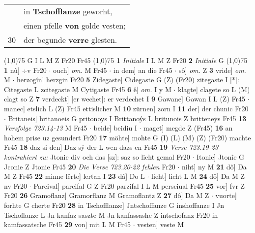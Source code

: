 \documentclass[8pt,a4paper,notitlepage]{article}
\begin{document}
\begin{table}[ht]
\begin{minipage}[t]{0.5\linewidth}
\begin{tabular}{rl}
 & in \textbf{Tschofflanze} geworht,\\ 
 & einen pfelle \textbf{von} golde vesten;\\ 
30 & der begunde \textbf{verre} glesten.\\ 
\end{tabular}
\scriptsize
\line(1,0){75} \newline
G I L M Z Fr20 Fr45 \newline
\line(1,0){75} \newline
\textbf{1} \textit{Initiale} I L M Z Fr20  \textbf{2} \textit{Initiale} G  \newline
\line(1,0){75} \newline
\textbf{1} nû] ÷v Fr20  $\cdot$ ouch] \textit{om.} M Fr45  $\cdot$ in dem] an die Fr45  $\cdot$ sô] \textit{om.} Z \textbf{3} vride] \textit{om.} M  $\cdot$ herzogîn] herzgin Fr20 \textbf{5} Zidegaste] Cidegaste G (Z) (Fr20) zitegaste I [*]: Citegaste L zcitegaste M Cytigaste Fr45 \textbf{6} ê] \textit{om.} I y M  $\cdot$ klagte] clagete so L (M) clagt so Z \textbf{7} verdeckt] [er wechet]: er verdechet I \textbf{9} Gawane] Gawan I L (Z) Fr45  $\cdot$ manec] etslich L (Z) Fr45 ettislicher M \textbf{10} zürnen] zorn I \textbf{11} der] der chunic Fr20  $\cdot$ Britaneis] britanoeis G pritonoys I Brittanoýs L britunois Z britteneẏs Fr45 \textbf{13} \textit{Versfolge 723.14-13} M Fr45   $\cdot$ beide] beidiu I  $\cdot$ maget] megde Z (Fr45) \textbf{16} an hohem prise uz gesundert Fr20 \textbf{17} möhte] mohte G (I) (L) (M) (Z) (Fr20) machte Fr45 \textbf{18} daz si den] Daz sẏ der L wen dazs en Fr45 \textbf{19} \textit{Verse 723.19-23 kontrahiert zu:} Jtonie div och das [sz]: saz so lieht gemal Fr20   $\cdot$ Itonie] Jtonîe G Jconie Z Jtonie Fr45 \textbf{20} \textit{Die Verse 723.20-22 fehlen} Fr20   $\cdot$ niht] ny M \textbf{21} dô] Da M Z Fr45 \textbf{22} minne lêrte] lertan I \textbf{23} dâ] Do L  $\cdot$ lieht] licht L M \textbf{24} dô] Da M Z nv Fr20  $\cdot$ Parcival] parcifal G Z Fr20 parzifal I L M persciual Fr45 \textbf{25} vor] fvr Z Fr20 \textbf{26} Gramoflanz] Gramorflanz M Gramoflantz Z \textbf{27} dô] Da M Z  $\cdot$ vuorte] forhte G cherte Fr20 \textbf{28} in Tschofflanze] Jntschoffanze G inshoffanze I Jn Tschoflanze L Jn kanfaz saszte M Jn kanfassashe Z intschofanz Fr20 in kamfassatsche Fr45 \textbf{29} von] mit L M Fr45  $\cdot$ vesten] veste M \newline
\end{minipage}
\hspace{0.5cm}
\begin{minipage}[t]{0.5\linewidth}

\end{minipage}
\end{table}
\end{document}

